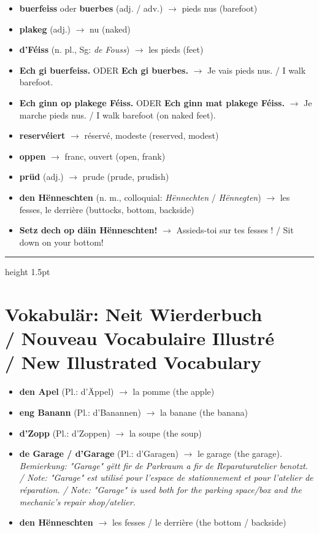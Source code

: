 \begin{itemize}
    \item \textbf{buerfeiss} oder \textbf{buerbes} (adj. / adv.) $\rightarrow$ pieds nus (barefoot)
    \item \textbf{plakeg} (adj.) $\rightarrow$ nu (naked)
    \item \textbf{d'Féiss} (n. pl., Sg: \textit{de Fouss}) $\rightarrow$ les pieds (feet)
    \item \textbf{Ech gi buerfeiss.} ODER \textbf{Ech gi buerbes.} $\rightarrow$ Je vais pieds nus. / I walk barefoot.
    \item \textbf{Ech ginn op plakege Féiss.} ODER \textbf{Ech ginn mat plakege Féiss.} $\rightarrow$ Je marche pieds nus. / I walk barefoot (on naked feet).
    \item \textbf{reservéiert} $\rightarrow$ réservé, modeste (reserved, modest)
    \item \textbf{oppen} $\rightarrow$ franc, ouvert (open, frank)
    \item \textbf{prüd} (adj.) $\rightarrow$ prude (prude, prudish)
    \item \textbf{den Hënneschten} (n. m., colloquial: \textit{Hënnechten} / \textit{Hënnegten}) $\rightarrow$ les fesses, le derrière (buttocks, bottom, backside)
    \item \textbf{Setz dech op däin Hënneschten!} $\rightarrow$ Assieds-toi sur tes fesses ! / Sit down on your bottom!
\end{itemize}

\vspace{1.5cm}
\color{geminiBlue}\hrule height 1.5pt \vspace{0.5em}\color{black}
\section[Vokabulär: Neit Wierderbuch]{Vokabulär: Neit Wierderbuch \\/ Nouveau Vocabulaire Illustré \\/ New Illustrated Vocabulary}

\begin{itemize}
    \item \textbf{den Apel} (Pl.: d'Äppel) $\rightarrow$ la pomme (the apple)
    \item \textbf{eng Banann} (Pl.: d'Banannen) $\rightarrow$ la banane (the banana)
    \item \textbf{d'Zopp} (Pl.: d'Zoppen) $\rightarrow$ la soupe (the soup)
    \item \textbf{de Garage / d'Garage} (Pl.: d'Garagen) $\rightarrow$ le garage (the garage). \textit{Bemierkung: "Garage" gëtt fir de Parkraum a fir de Reparaturatelier benotzt. / Note: "Garage" est utilisé pour l'espace de stationnement et pour l'atelier de réparation. / Note: "Garage" is used both for the parking space/box and the mechanic's repair shop/atelier.}
    \item \textbf{den Hënneschten} $\rightarrow$ les fesses / le derrière (the bottom / backside)
\end{itemize}

